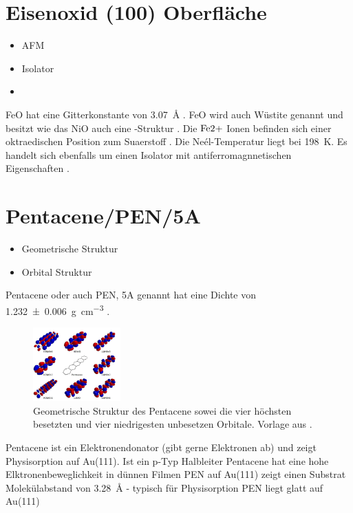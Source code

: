     \section{Eisenoxid (100) Oberfläche}
        \begin{itemize}
            \item AFM
            \item Isolator
            \item 
        \end{itemize}
        FeO hat eine Gitterkonstante von \SI{3.07}{\angstrom} \cite{FeO_1}.
        FeO wird auch Wüstite genannt und besitzt wie das NiO auch eine -Struktur \cite{FeO_4}.
        Die $\ce{Fe{2+}}$ Ionen befinden sich einer oktraedischen Position zum Suaerstoff \cite{FeO_4}.
        Die Neél-Temperatur liegt bei \SI{198}{\kelvin}.
        Es handelt sich ebenfalls um einen Isolator mit antiferromagnnetischen Eigenschaften \cite{FeO_4}.

    \section{Pentacene/PEN/5A}
        \begin{itemize}
            \item Geometrische Struktur
            \item Orbital Struktur
        \end{itemize}
        Pentacene oder auch PEN, 5A genannt hat eine Dichte von \SI{1.232(6)}{\gram\per\cubic\centi\meter} \cite{CAS}.
        \begin{figure}
            \centering
            \includegraphics[width=0.3\textwidth]{./content/PEN.jpg}
            \caption{Geometrische Struktur des Pentacene sowei die vier höchsten besetzten und vier niedrigesten unbesetzen Orbitale. Vorlage aus \cite{PEN}.}
            \label{fig:PEN}
        \end{figure}
        
        \textbf{\cite{5A_1}}
        Pentacene ist ein Elektronendonator (gibt gerne Elektronen ab) und zeigt Physisorption auf Au(111).
        Ist ein p-Typ Halbleiter
        Pentacene hat eine hohe Elktronenbeweglichkeit in dünnen Filmen
        PEN auf Au(111) zeigt einen Substrat Molekülabstand von \SI{3.28}{\angstrom} - typisch für Physisorption
        PEN liegt glatt auf Au(111)
    